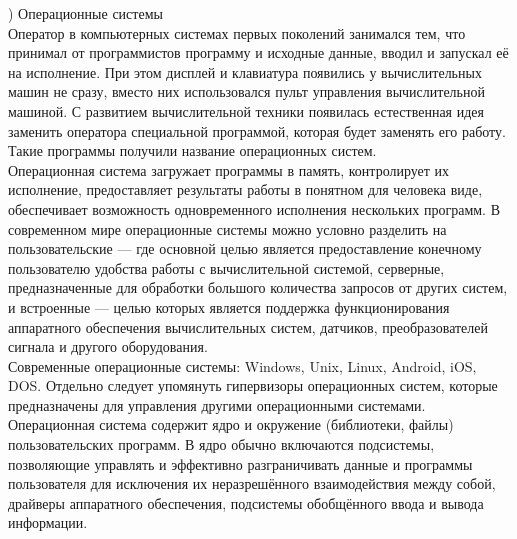 

) Операционные системы \\
\noindent Оператор в компьютерных системах первых поколений занимался тем, что принимал от программистов программу и исходные данные, вводил и запускал её на исполнение. При этом дисплей и клавиатура появились у вычислительных машин не сразу, вместо них использовался пульт управления вычислительной машиной. С развитием вычислительной техники появилась естественная идея заменить оператора специальной программой, которая будет заменять его работу. Такие программы получили название операционных систем. \\
Операционная система загружает программы в память, контролирует их исполнение, предоставляет результаты работы в понятном для человека виде, обеспечивает возможность одновременного исполнения нескольких программ. В современном мире операционные системы можно условно разделить на пользовательские — где основной целью является предоставление конечному пользователю удобства работы с вычислительной системой, серверные, предназначенные для обработки большого количества запросов от других систем, и встроенные — целью которых является поддержка функционирования аппаратного обеспечения вычислительных систем, датчиков, преобразователей сигнала и другого оборудования. \\
Современные операционные системы: Windows, Unix, Linux, Android, iOS, DOS. Отдельно следует упомянуть гипервизоры операционных систем, которые предназначены для управления другими операционными системами. \\
Операционная система содержит ядро и окружение (библиотеки, файлы) пользовательских программ. В ядро обычно включаются подсистемы, позволяющие управлять и эффективно разграничивать данные и программы пользователя для исключения их неразрешённого взаимодействия между собой, драйверы аппаратного обеспечения, подсистемы обобщённого ввода и вывода информации. \\

